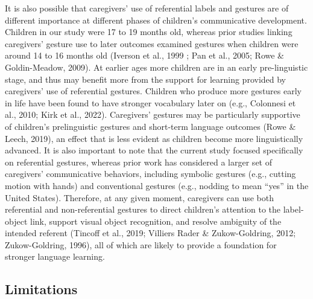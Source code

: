 \documentclass[
  english,
  man,mask]{apa6}
\begin{document}
It is also possible that caregivers' use of referential labels and gestures are of different importance at different phases of children's communicative development. Children in our study were 17 to 19 months old, whereas prior studies linking caregivers' gesture use to later outcomes examined gestures when children were around 14 to 16 months old (Iverson et al., 1999 ; Pan et al., 2005; Rowe \& Goldin-Meadow, 2009). At earlier ages more children are in an early pre-linguistic stage, and thus may benefit more from the support for learning provided by caregivers' use of referential gestures. Children who produce more gestures early in life have been found to have stronger vocabulary later on (e.g., Colonnesi et al., 2010; Kirk et al., 2022). Caregivers' gestures may be particularly supportive of children's prelinguistic gestures and short-term language outcomes (Rowe \& Leech, 2019), an effect that is less evident as children become more linguistically advanced. It is also important to note that the current study focused specifically on referential gestures, whereas prior work has considered a larger set of caregivers' communicative behaviors, including symbolic gestures (e.g., cutting motion with hands) and conventional gestures (e.g., nodding to mean \enquote{yes} in the United States). Therefore, at any given moment, caregivers can use both referential and non-referential gestures to direct children's attention to the label-object link, support visual object recognition, and resolve ambiguity of the intended referent (Tincoff et al., 2019; Villiers Rader \& Zukow-Goldring, 2012; Zukow-Goldring, 1996), all of which are likely to provide a foundation for stronger language learning.

\hypertarget{limitations}{%
\subsection{Limitations}\label{limitations}}
\end{document}
